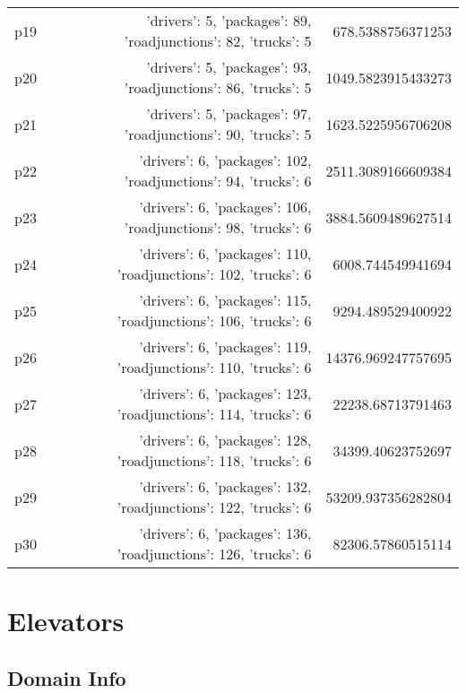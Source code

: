 \documentclass{article}
\begin{document}
\begin{center}
\begin{tabular}{r|r|r}
  p19&{'drivers': 5, 'packages': 89, 'roadjunctions': 82, 'trucks': 5}&678.5388756371253\\
  p20&{'drivers': 5, 'packages': 93, 'roadjunctions': 86, 'trucks': 5}&1049.5823915433273\\
  p21&{'drivers': 5, 'packages': 97, 'roadjunctions': 90, 'trucks': 5}&1623.5225956706208\\
  p22&{'drivers': 6, 'packages': 102, 'roadjunctions': 94, 'trucks': 6}&2511.3089166609384\\
  p23&{'drivers': 6, 'packages': 106, 'roadjunctions': 98, 'trucks': 6}&3884.5609489627514\\
  p24&{'drivers': 6, 'packages': 110, 'roadjunctions': 102, 'trucks': 6}&6008.744549941694\\
  p25&{'drivers': 6, 'packages': 115, 'roadjunctions': 106, 'trucks': 6}&9294.489529400922\\
  p26&{'drivers': 6, 'packages': 119, 'roadjunctions': 110, 'trucks': 6}&14376.969247757695\\
  p27&{'drivers': 6, 'packages': 123, 'roadjunctions': 114, 'trucks': 6}&22238.68713791463\\
  p28&{'drivers': 6, 'packages': 128, 'roadjunctions': 118, 'trucks': 6}&34399.40623752697\\
  p29&{'drivers': 6, 'packages': 132, 'roadjunctions': 122, 'trucks': 6}&53209.937356282804\\
  p30&{'drivers': 6, 'packages': 136, 'roadjunctions': 126, 'trucks': 6}&82306.57860515114
                            \end{tabular}
                            \end{center}
                    
                            \newpage \section{Elevators}
                    \subsection*{Domain Info}
\end{document}

